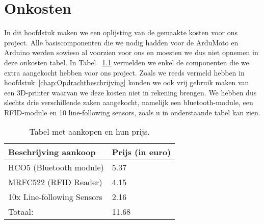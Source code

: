 \chapter{Onkosten}
In dit hoofdstuk maken we een oplijsting van de gemaakte kosten voor ons project.  Alle basiscomponenten die we nodig hadden voor de ArduMoto en Arduino werden sowieso al voorzien voor ons en moesten we dus niet opnemen in deze onkosten tabel. In Tabel ~\ref{table:Onkosten} vermelden we enkel de componenten die we extra aangekocht hebben voor ons project. Zoals we reeds vermeld hebben in hoofdstuk~\ref{chap:Opdrachtbeschrijving} konden we ook vrij gebruik maken van een 3D-printer waarvan we deze kosten niet in rekening brengen. We hebben dus slechts drie verschillende zaken aangekocht, namelijk een bluetooth-module, een RFID-module en 10 line-following sensors, zoals u in onderstaande tabel kan zien.\\
\begin {table}[H]
\caption {Tabel met aankopen en hun prijs.} \label{table:Onkosten}
\begin{center}
	\begin{tabular}{ | l | l | }
	\hline
	Beschrijving aankoop & Prijs (in euro) \\ \hline
	\hline
	HCO5 (Bluetooth module) & 5.37 \\ \hline
	MRFC522 (RFID Reader) & 4.15 \\ \hline
	10x Line-following Sensors & 2.16 \\ \hline \hline
	Totaal: & 11.68 \\ \hline
	\end{tabular}
\end{center}
\end{table}
